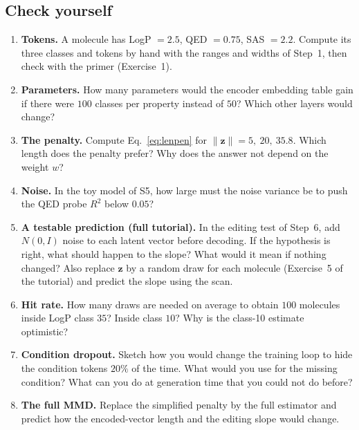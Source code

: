 \documentclass[11pt]{article}
\begin{document}
\subsection*{Check yourself}
\begin{enumerate}
  \item \textbf{Tokens.} A molecule has LogP $=2.5$, QED $=0.75$, SAS $=2.2$. Compute its three classes and tokens by hand with the ranges and widths of Step~1, then check with the primer (Exercise~1).
  \item \textbf{Parameters.} How many parameters would the encoder embedding table gain if there were $100$ classes per property instead of $50$? Which other layers would change?
  \item \textbf{The penalty.} Compute Eq.~\eqref{eq:lenpen} for $\lVert\bm z\rVert=5,\ 20,\ 35.8$. Which length does the penalty prefer? Why does the answer not depend on the weight $w$?
  \item \textbf{Noise.} In the toy model of S5, how large must the noise variance be to push the QED probe $R^2$ below $0.05$?
  \item \textbf{A testable prediction (full tutorial).} In the editing test of Step~6, add $N(0,I)$ noise to each latent vector before decoding. If the hypothesis is right, what should happen to the slope? What would it mean if nothing changed? Also replace $\bm z$ by a random draw for each molecule (Exercise~5 of the tutorial) and predict the slope using the scan.
  \item \textbf{Hit rate.} How many draws are needed on average to obtain $100$ molecules inside LogP class $35$? Inside class $10$? Why is the class-10 estimate optimistic?
  \item \textbf{Condition dropout.} Sketch how you would change the training loop to hide the condition tokens $20\%$ of the time. What would you use for the missing condition? What can you do at generation time that you could not do before?
  \item \textbf{The full MMD.} Replace the simplified penalty by the full estimator and predict how the encoded-vector length and the editing slope would change.
\end{enumerate}
\end{document}
